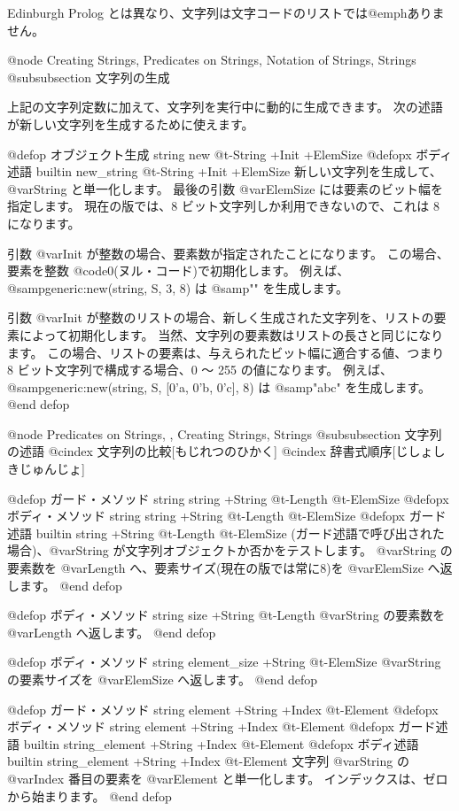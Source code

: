 {{{{Edinburgh Prolog とは異なり、文字列は文字コードのリストでは@emph{ありません}。

@node Creating Strings, Predicates on Strings, Notation of Strings, Strings
@subsubsection 文字列の生成

上記の文字列定数に加えて、文字列を実行中に動的に生成できます。
次の述語が新しい文字列を生成するために使えます。

@defop {オブジェクト生成} {string} new @t{-}String +Init +ElemSize
@defopx {ボディ述語} {builtin} new_string @t{-}String +Init +ElemSize
新しい文字列を生成して、@var{String} と単一化します。
最後の引数 @var{ElemSize} には要素のビット幅を指定します。
現在の版では、8 ビット文字列しか利用できないので、これは 8 になります。

引数 @var{Init} が整数の場合、要素数が指定されたことになります。
この場合、要素を整数 @code{0}(ヌル・コード)で初期化します。
例えば、@samp{generic:new(string, S, 3, 8)} は @samp{"\0\0\0"} を生成します。

引数 @var{Init} が整数のリストの場合、新しく生成された文字列を、リストの要素によって初期化します。
当然、文字列の要素数はリストの長さと同じになります。
この場合、リストの要素は、与えられたビット幅に適合する値、つまり 8 ビット文字列で構成する場合、0 〜 255 の値になります。
例えば、@samp{generic:new(string, S, [0'a, 0'b, 0'c], 8)} は @samp{"abc"} を生成します。
@end defop

@node Predicates on Strings,  , Creating Strings, Strings
@subsubsection 文字列の述語
@cindex 文字列の比較[もじれつのひかく]
@cindex 辞書式順序[じしょしきじゅんじょ]

@defop {ガード・メソッド} {string} string +String @t{-}Length @t{-}ElemSize
@defopx {ボディ・メソッド} {string} string +String @t{-}Length @t{-}ElemSize
@defopx {ガード述語} {builtin} string +String @t{-}Length @t{-}ElemSize
(ガード述語で呼び出された場合)、@var{String} が文字列オブジェクトか否かをテストします。
@var{String} の要素数を @var{Length} へ、要素サイズ(現在の版では常に8)を @var{ElemSize} へ返します。
@end defop

@defop {ボディ・メソッド} {string} size +String @t{-}Length
@var{String} の要素数を @var{Length} へ返します。
@end defop

@defop {ボディ・メソッド} {string} element_size +String @t{-}ElemSize
@var{String} の要素サイズを @var{ElemSize} へ返します。
@end defop

@defop {ガード・メソッド} {string} element +String +Index @t{-}Element
@defopx {ボディ・メソッド} {string} element +String +Index @t{-}Element
@defopx {ガード述語} {builtin} string_element +String +Index @t{-}Element
@defopx {ボディ述語} {builtin} string_element +String +Index @t{-}Element
文字列 @var{String} の @var{Index} 番目の要素を @var{Element} と単一化します。
インデックスは、ゼロから始まります。
@end defop

}}}}
